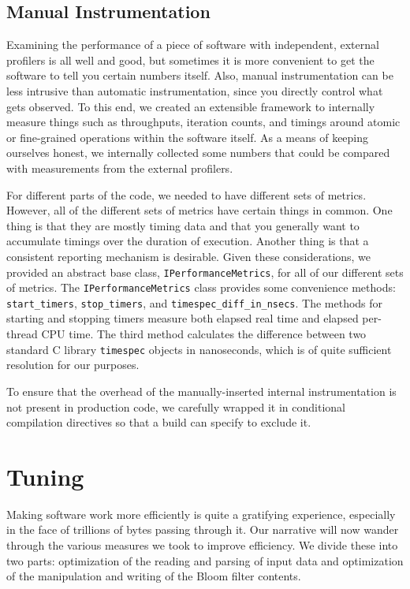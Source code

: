 \subsection{Manual Instrumentation}

Examining the performance of a piece of software with independent, external
profilers is all well and good, but sometimes it is more convenient to get the
software to tell you certain numbers itself. Also, manual instrumentation can
be less intrusive than automatic instrumentation, since you directly control
what gets observed. To this end, we created an extensible framework to
internally measure things such as throughputs, iteration counts, and timings
around atomic or fine-grained operations within the software itself. As a means
of keeping ourselves honest, we internally collected some numbers that could be
compared with measurements from the external profilers.

For different parts of the code, we needed to have different sets of metrics.
However, all of the different sets of metrics have certain things in common.
One thing is that they are mostly timing data and that you generally want to
accumulate timings over the duration of execution. Another thing is that a
consistent reporting mechanism is desirable. Given these considerations, we
provided an abstract base class, \texttt{IPerformanceMetrics}, for all of our
different sets of metrics. The \texttt{IPerformanceMetrics} class provides some
convenience methods: \texttt{start\_timers}, \texttt{stop\_timers}, and
\texttt{timespec\_diff\_in\_nsecs}. The methods for starting and stopping
timers measure both elapsed real time and elapsed per-thread CPU time. The
third method calculates the difference between two standard C library
\texttt{timespec} objects in nanoseconds, which is of quite sufficient
resolution for our purposes.

To ensure that the overhead of the manually-inserted internal instrumentation
is not present in production code, we carefully wrapped it in conditional
compilation directives so that a build can specify to exclude it.

\section{Tuning}

Making software work more efficiently is quite a gratifying experience,
especially in the face of trillions of bytes passing through it. Our narrative
will now wander through the various measures we took to improve efficiency. We
divide these into two parts: optimization of the reading and parsing of input
data and optimization of the manipulation and writing of the Bloom filter
contents.

